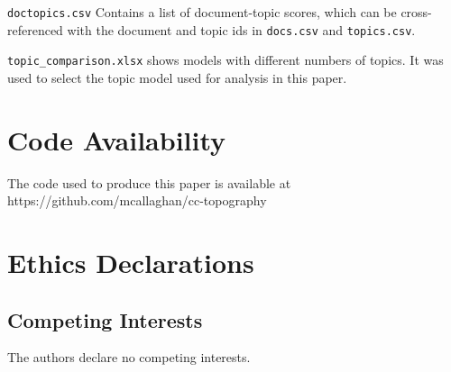 \documentclass{article}
\begin{document}
	\medskip\noindent
	\texttt{doctopics.csv} Contains a list of document-topic scores, which can be cross-referenced with the document and topic ids in \texttt{docs.csv} and \texttt{topics.csv}.
	
	\medskip\noindent
	\texttt{topic\_comparison.xlsx} shows models with different numbers of topics. It was used to select the topic model used for analysis in this paper.
	
	\section*{Code Availability}
	
	The code used to produce this paper is available at https://github.com/mcallaghan/cc-topography
	
	\section*{Ethics Declarations}

	\subsection*{Competing Interests}
	The authors declare no competing interests.
	
	\linespread{1}
	
	
	
	

	
	
\end{document}
